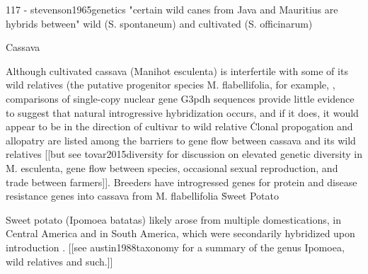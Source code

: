 \documentclass[11pt]{article}
\begin{document}
117 - stevenson1965genetics
    "certain wild canes from Java and Mauritius are hybrids between" wild (S. spontaneum) and cultivated (S. officinarum)















Cassava

Although cultivated cassava (Manihot esculenta) is interfertile with some of its wild relatives (the putative progenitor species M. flabellifolia, for example, \cite{roa1997aflp}\), comparisons of single-copy nuclear gene G3pdh sequences provide little evidence to suggest that natural introgressive hybridization occurs, and if it does, it would appear to be in the direction of cultivar to wild relative \cite{olsen1999evidence}\.
Clonal propogation and allopatry are listed among the barriers to gene flow between cassava and its wild relatives [[but see tovar2015diversity for discussion on elevated genetic diversity in M. esculenta, gene flow between species, occasional sexual reproduction, and trade between farmers]].
Breeders have introgressed genes for protein and disease resistance genes into cassava from M. flabellifolia \cite{akinbo2008introgression}\.



















Sweet Potato

Sweet potato (Ipomoea batatas) likely arose from multiple domestications, in Central America and in South America, which were secondarily hybridized upon introduction \cite{roullier2013disentangling}.  [[see austin1988taxonomy for a summary of the genus Ipomoea, wild relatives and such.]]
\end{document}

